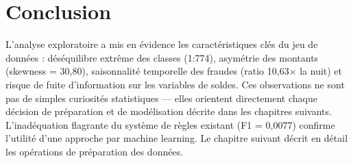 \section*{Conclusion}

L'analyse exploratoire a mis en évidence les caractéristiques clés du jeu de données :
déséquilibre extrême des classes (1:774), asymétrie des montants (skewness = 30,80),
saisonnalité temporelle des fraudes (ratio 10,63× la nuit) et risque de fuite d'information
sur les variables de soldes. Ces observations ne sont pas de simples curiosités statistiques
--- elles orientent directement chaque décision de préparation et de modélisation décrite
dans les chapitres suivants. L'inadéquation flagrante du système de règles existant
(F1 = 0,0077) confirme l'utilité d'une approche par machine learning. Le chapitre suivant
décrit en détail les opérations de préparation des données.
